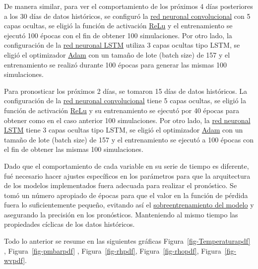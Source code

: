 \documentclass[
  us-letterpaper,
]{scrreprt}
\theoremstyle{plain}
\theoremstyle{definition}
\theoremstyle{definition}
\theoremstyle{remark}
\begin{document}
De manera similar, para ver el comportamiento de los próximos 4 días
posteriores a los 30 días de datos históricos, se configuró la
\hyperref[sec-implementaciuxf3n-de-la-red-neuronal-cnn]{red neuronal
convolucional} con 5 capas ocultas, se eligió la función de activación
\hyperref[sec-Relu]{ReLu} y el entrenamiento se ejecutó 100 épocas con
el fin de obtener 100 simulaciones. Por otro lado, la configuración de
la \hyperref[sec-implementaciuxf3n-de-la-red-neuronal-lstm]{red neuronal
LSTM} utiliza 3 capas ocultas tipo LSTM, se eligió el optimizador
\hyperref[sec-Adam]{Adam} con un tamaño de lote (batch size) de 157 y el
entrenamiento se realizó durante 100 épocas para generar las mismas 100
simulaciones.

Para pronosticar los próximos 2 días, se tomaron 15 días de datos
históricos. La configuración de la
\hyperref[sec-implementaciuxf3n-de-la-red-neuronal-cnn]{red neuronal
convolucional} tiene 5 capas ocultas, se eligió la función de activación
\hyperref[sec-Relu]{ReLu} y su entrenamiento se ejecutó por 40 épocas
para obtener como en el caso anterior 100 simulaciones. Por otro lado,
la \hyperref[sec-implementaciuxf3n-de-la-red-neuronal-lstm]{red neuronal
LSTM} tiene 3 capas ocultas tipo LSTM, se eligió el optimizador
\hyperref[sec-Adam]{Adam} con un tamaño de lote (batch size) de 157 y el
entrenamiento se ejecutó a 100 épocas con el fin de obtener las mismas
100 simulaciones.

Dado que el comportamiento de cada variable en su serie de tiempo es
diferente, fué necesario hacer ajustes específicos en los parámetros
para que la arquitectura de los modelos implementados fuera adecuada
para realizar el pronóstico. Se tomó un número apropiado de épocas para
que el valor en la función de pérdida fuera lo suficientemente pequeño,
evitando así el \hyperref[sec-sobreentrenamiento]{sobreentrenamiento del
modelo} y asegurando la precisión en los pronósticos. Manteniendo al
mismo tiempo las propiedades cíclicas de los datos históricos.

Todo lo anterior se resume en las siguientes gráficas
Figura~\ref{fig-Temperaturapdf} , Figura~\ref{fig-pmbarpdf} ,
Figura~\ref{fig-rhpdf}, Figura~\ref{fig-rhopdf}, Figura~\ref{fig-wvpdf}.
\end{document}
